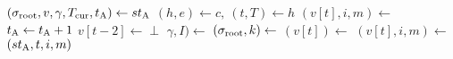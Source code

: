 \algrenewcommand\textproc{}
\algrenewcommand{}

\begin{minipage}{1\linewidth}
  {\fontsize{8}{10}\selectfont

  \begin{algorithmic}[1]
    \State $(\sigma_\text{root},v,\gamma,T_\text{cur},t_\text{A}) \gets st_\text{A}$
    \State $(h,e) \gets c, \ (t,T) \gets h$
    \State $(v[t],i,m) \gets$ 
    \State $t_\text{A} \gets t_\text{A}+1$
    \State $v[t-2] \gets \perp$
    \State $\gamma,I) \gets$ 
    \State $(\sigma_\text{root},k) \gets$ 
    \State $(v[t]) \gets$ 
    \State $(v[t],i,m) \gets$ 
    \EndIf
    \State \Return $(st_\text{A},t,i,m)$
    \EndProcedure
  \end{algorithmic}
  }
\end{minipage}
